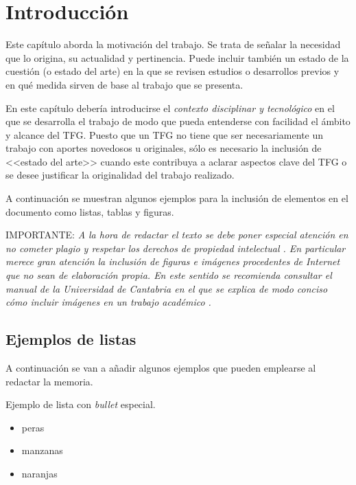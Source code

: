 \chapter{Introducción}
\label{cap:Introduccion}

Este capítulo aborda la motivación del trabajo. Se trata de señalar la necesidad que lo origina, su actualidad y pertinencia. Puede incluir también un estado de la cuestión (o estado del arte) en la que se revisen estudios o desarrollos previos y en qué medida sirven de base al trabajo que se presenta.

En este capítulo debería introducirse el \emph{contexto disciplinar y tecnológico} en el que se desarrolla el trabajo de modo que pueda entenderse con facilidad el ámbito y alcance del TFG. Puesto que un TFG no tiene que ser necesariamente un trabajo con aportes novedosos u originales, sólo es necesario la inclusión de <<estado del arte>> cuando este contribuya a aclarar aspectos clave del TFG o se desee justificar la originalidad del trabajo realizado.

A continuación se muestran algunos ejemplos para la inclusión de elementos en el documento como listas, tablas y figuras.

\noindent \textsc{IMPORTANTE}: \emph{A la hora de redactar el texto se debe poner especial atención en no cometer plagio y respetar los derechos de propiedad intelectual \cite{refer00,sidney00}. En particular merece gran atención la inclusión de figuras e imágenes procedentes de Internet que no sean de elaboración propia. En este sentido se recomienda consultar el manual de la Universidad de Cantabria en el que se explica de modo conciso cómo incluir imágenes en un trabajo académico \cite{unican18}.}

\section{Ejemplos de listas}
\label{sec:ejListas}
A continuación se van a añadir algunos ejemplos que pueden emplearse al redactar la memoria.

\noindent Ejemplo de lista con \emph{bullet} especial. 
\begin{itemize}
	\item[\ding{52}] peras
	\item manzanas
	\item naranjas
\end{itemize}


